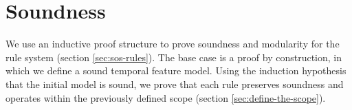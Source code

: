 \chapter{Soundness}
\label{cha:soundness}



We use an inductive proof structure to prove soundness and modularity for the rule system (section \vref{sec:sos-rules}). The base case is a proof by construction, in which we define a sound temporal feature model. Using the induction hypothesis that the initial model is sound, we prove that each rule preserves soundness and operates within the previously defined scope (section \vref{sec:define-the-scope}).






















